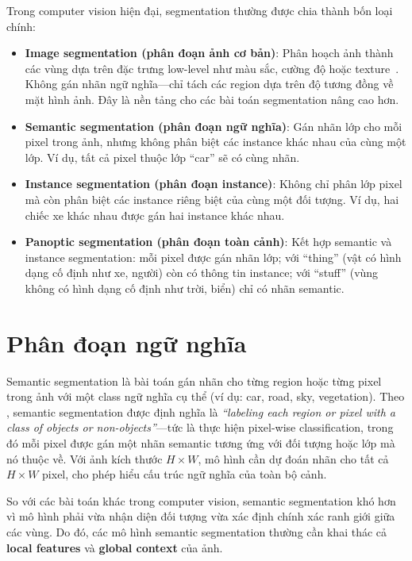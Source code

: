 Trong computer vision hiện đại, segmentation thường được chia thành bốn loại chính:

\begin{itemize}
\item \textbf{Image segmentation (phân đoạn ảnh cơ bản)}: Phân hoạch ảnh thành các vùng dựa trên đặc trưng low-level như màu sắc, cường độ hoặc texture~\cite{lateef2019survey}. Không gán nhãn ngữ nghĩa---chỉ tách các region dựa trên độ tương đồng về mặt hình ảnh. Đây là nền tảng cho các bài toán segmentation nâng cao hơn.
\item \textbf{Semantic segmentation (phân đoạn ngữ nghĩa)}: Gán nhãn lớp cho mỗi pixel trong ảnh, nhưng không phân biệt các instance khác nhau của cùng một lớp. Ví dụ, tất cả pixel thuộc lớp ``car'' sẽ có cùng nhãn.
\item \textbf{Instance segmentation (phân đoạn instance)}: Không chỉ phân lớp pixel mà còn phân biệt các instance riêng biệt của cùng một đối tượng. Ví dụ, hai chiếc xe khác nhau được gán hai instance khác nhau.
\item \textbf{Panoptic segmentation (phân đoạn toàn cảnh)}: Kết hợp semantic và instance segmentation: mỗi pixel được gán nhãn lớp; với ``thing'' (vật có hình dạng cố định như xe, người) còn có thông tin instance; với ``stuff'' (vùng không có hình dạng cố định như trời, biển) chỉ có nhãn semantic.
\end{itemize}

\section{Phân đoạn ngữ nghĩa}

Semantic segmentation là bài toán gán nhãn cho từng region hoặc từng pixel trong ảnh với một class ngữ nghĩa cụ thể (ví dụ: car, road, sky, vegetation). Theo \cite{lateef2019survey}, semantic segmentation được định nghĩa là \emph{``labeling each region or pixel with a class of objects or non-objects''}---tức là thực hiện pixel-wise classification, trong đó mỗi pixel được gán một nhãn semantic tương ứng với đối tượng hoặc lớp mà nó thuộc về. Với ảnh kích thước $H \times W$, mô hình cần dự đoán nhãn cho tất cả $H \times W$ pixel, cho phép hiểu cấu trúc ngữ nghĩa của toàn bộ cảnh.

So với các bài toán khác trong computer vision, semantic segmentation khó hơn vì mô hình phải vừa nhận diện đối tượng vừa xác định chính xác ranh giới giữa các vùng. Do đó, các mô hình semantic segmentation thường cần khai thác cả \textbf{local features} và \textbf{global context} của ảnh.

